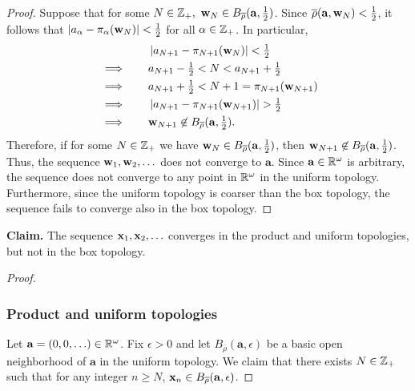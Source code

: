 \begin{solution}
\begin{proof}
        Suppose that for some $N \in \mathbb{Z}_+,~ \mathbf{w}_N \in B_{\overline{\rho}}(\mathbf{a}, \tfrac{1}{2})$.
        Since $\overline{\rho}(\mathbf{a}, \mathbf{w}_N) < \tfrac{1}{2}$, it follows that $\left| a_\alpha - \pi_\alpha(\mathbf{w}_N) \right| < \tfrac{1}{2}$ for all $\alpha \in \mathbb{Z}_+$.
        In particular,
        \begin{alignat*}{2}
            &           && \quad \left| a_{N+1} - \pi_{N+1}(\mathbf{w}_N) \right| < \tfrac{1}{2} \\
            & \implies  && \quad a_{N+1} - \tfrac{1}{2} < N < a_{N+1} + \tfrac{1}{2} \\
            & \implies  && \quad a_{N+1} + \tfrac{1}{2} < N + 1 = \pi_{N+1}(\mathbf{w}_{N+1}) \\
            & \implies  && \quad \left| a_{N+1} - \pi_{N+1}(\mathbf{w}_{N+1}) \right| > \tfrac{1}{2} \\
            & \implies  && \quad \mathbf{w}_{N+1} \not\in B_{\overline{\rho}}(\mathbf{a}, \tfrac{1}{2}).
        \end{alignat*}
        Therefore, if for some $N \in \mathbb{Z}_+$ we have $\mathbf{w}_N \in B_{\overline{\rho}}(\mathbf{a}, \tfrac{1}{2})$, then $\mathbf{w}_{N+1} \not\in B_{\overline{\rho}}(\mathbf{a}, \tfrac{1}{2})$.
        Thus, the sequence $\mathbf{w}_1, \mathbf{w}_2, \ldots$ does not converge to $\mathbf{a}$.
        Since $\mathbf{a} \in \mathbb{R}^\omega$ is arbitrary, the sequence does not converge to any point in $\mathbb{R}^\omega$ in the uniform topology.
        Furthermore, since the uniform topology is coarser than the box topology, the sequence fails to converge also in the box topology.
    \end{proof}
    \bigskip

    \noindent\textbf{Claim.} The sequence $\mathbf{x}_1, \mathbf{x}_2, \ldots$ converges in the product and uniform topologies, but not in the box topology.
    \begin{proof}~

        \subsubsection*{Product and uniform topologies}
        Let $\mathbf{a} = (0, 0, \ldots) \in \mathbb{R}^\omega$.
        Fix $\epsilon > 0$ and let $B_{\overline{\rho}}(\mathbf{a}, \epsilon)$ be a basic open neighborhood of $\mathbf{a}$ in the uniform topology.
        We claim that there exists $N \in \mathbb{Z}_+$ such that for any integer $n \geq N$, $\mathbf{x}_n \in B_{\overline{\rho}}(\mathbf{a}, \epsilon)$.


\end{proof}
\end{solution}
